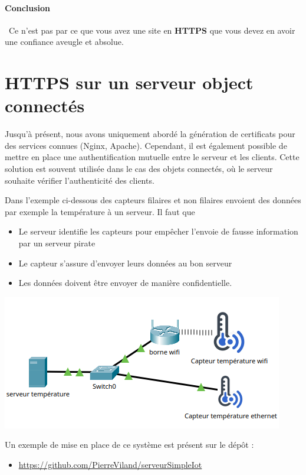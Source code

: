 \documentclass[french, 12pt]{article}%
\newcommand{\itemE}{\item[$\bullet$]}
\begin{document}
\paragraph{Conclusion} \ 
Ce n'est pas par ce que vous avez une site en \textbf{HTTPS} que vous devez en avoir une confiance aveugle et absolue.



\section{HTTPS sur un serveur object connectés}

Jusqu'à présent, nous avons uniquement abordé la génération de certificats pour des services connues (Nginx, Apache). Cependant, il est également possible de mettre en place une authentification mutuelle entre le serveur et les clients. Cette solution est souvent utilisée dans le cas des objets connectés, où le serveur souhaite vérifier l'authenticité des clients. 

Dans l'exemple ci-dessous des capteurs filaires et non filaires envoient des données par exemple la température à un serveur. Il faut que 
\begin{itemize}
\itemE Le serveur identifie les capteurs pour empêcher l'envoie de fausse information par un serveur pirate
\itemE Le capteur s'assure d'envoyer leurs données au bon serveur
\itemE Les données doivent être envoyer de manière confidentielle.
\end{itemize}

\begin{center}
\includegraphics[scale=0.7]{./ressource/topoCapteurTemperature.png}
\end{center}


Un exemple de mise en place de ce système est présent sur le dépôt : 
\begin{itemize}
\itemE \href{https://github.com/PierreViland/serveurSimpleIot.git}{https://github.com/PierreViland/serveurSimpleIot}
\end{itemize}
\end{document}
